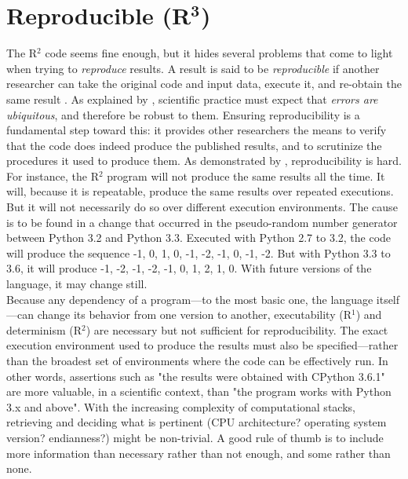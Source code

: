 \documentclass[a4paper,11pt]{article}
\begin{document}
\section*{Reproducible (R$^{\mathbf 3}$)}

The R$^2$ code seems fine enough, but it hides several problems that come to light when trying to {\em reproduce} results. A result is said to be \emph{reproducible} if another researcher can take the original code and input data, execute it, and re-obtain the same result \parencite{Peng:2006}. As explained by \citeauthor{Donoho:2009} \parencite{Donoho:2009}, scientific practice must expect that {\em errors are ubiquitous}, and therefore be robust to them. Ensuring reproducibility is a fundamental step toward this: it provides other researchers the means to verify that the code does indeed produce the published results, and to scrutinize the procedures it used to produce them. As demonstrated by \citeauthor{Mesnard:2016} \citep{Mesnard:2016}, reproducibility is hard.\\

For instance, the R$^2$ program will not produce the same results all the time. It will, because it is repeatable, produce the same results over repeated executions. But it will not necessarily do so over different execution environments. The cause is to be found in a change that occurred in the pseudo-random number generator between Python 3.2 and Python 3.3. Executed with Python 2.7 to 3.2, the code will produce the sequence -1, 0, 1, 0, -1, -2, -1, 0, -1, -2. But with Python 3.3 to 3.6, it will produce -1, -2, -1, -2, -1, 0, 1, 2, 1, 0. With future versions of the language, it may change still.\\

Because any dependency of a program---to the most basic one, the language itself---can change its behavior from one version to another, executability (R$^1$) and determinism (R$^2$) are necessary but not sufficient for reproducibility. The exact execution environment used to produce the results must also be specified---rather than the broadest set of environments where the code can be effectively run. In other words, assertions such as "the results were obtained with CPython 3.6.1" are more valuable, in a scientific context, than "the program works with Python 3.x and above". With the increasing complexity of computational stacks, retrieving and deciding what is pertinent (CPU architecture? operating system version? endianness?) might be non-trivial. A good rule of thumb is to include more information than necessary rather than not enough, and some rather than none.\\
\end{document}
